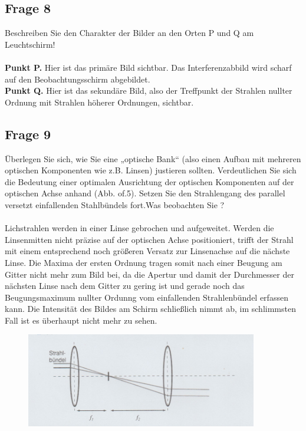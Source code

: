 \documentclass[a4paper,10pt]{scrartcl}
\begin{document}
	\subsection{Frage 8}
		Beschreiben Sie den Charakter der Bilder an den Orten P und Q am Leuchtschirm!
		\\
		\\
		\textbf{Punkt P.} Hier ist das primäre Bild sichtbar. Das Interferenzabbild wird scharf auf den Beobachtungsschirm abgebildet.\\
		\textbf{Punkt Q.} Hier ist das sekundäre Bild, also der Treffpunkt der Strahlen nullter Ordnung mit Strahlen höherer Ordnungen, sichtbar.
	\subsection{Frage 9}
		Überlegen Sie sich, wie Sie eine „optische Bank“ (also einen Aufbau mit mehreren optischen Komponenten wie z.B. Linsen) justieren sollten. Verdeutlichen Sie sich die Bedeutung einer optimalen Ausrichtung der optischen Komponenten auf der optischen Achse anhand (Abb. of.5). Setzen Sie den Strahlengang des parallel versetzt einfallenden Stahlbündels fort.Was beobachten Sie ?
		\\
		\\
		Lichstrahlen werden in einer Linse gebrochen und aufgeweitet. Werden die Linsenmitten nicht präzise auf der optischen Achse positioniert, trifft der Strahl mit einem entsprechend noch größeren Versatz zur Linsenachse auf die nächste Linse. Die Maxima der ersten Ordnung tragen somit nach einer Beugung am Gitter nicht mehr zum Bild bei, da die Apertur und damit der Durchmesser der nächsten Linse nach dem Gitter zu gering ist und gerade noch das Beugungsmaximum nullter Ordunng vom einfallenden Strahlenbündel erfassen kann. Die Intensität des Bildes am Schirm schließlich nimmt ab, im schlimmsten Fall ist es überhaupt nicht mehr zu sehen.
		\\
				\begin{figure}[h]
\centering
\includegraphics[width=0.9\textwidth]{./Bilder/ofa9}

\end{figure}
\FloatBarrier
			
\end{document}
